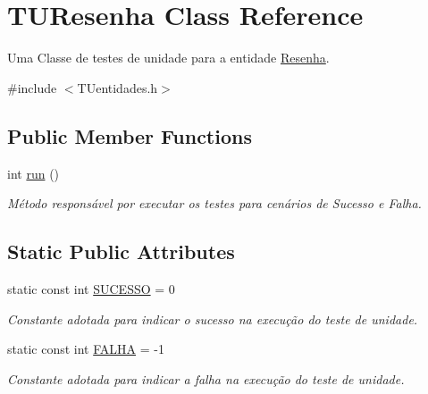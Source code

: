 \hypertarget{classTUResenha}{}\section{T\+U\+Resenha Class Reference}
\label{classTUResenha}


Uma Classe de testes de unidade para a entidade \hyperlink{classResenha}{Resenha}.  




{\ttfamily \#include $<$T\+Uentidades.\+h$>$}

\subsection*{Public Member Functions}
\begin{DoxyCompactItemize}
\item 
int \hyperlink{classTUResenha_a255531383ebe29a85c654a848288d89c}{run} ()
\begin{DoxyCompactList}\small\item\em Método responsável por executar os testes para cenários de Sucesso e Falha. \end{DoxyCompactList}\end{DoxyCompactItemize}
\subsection*{Static Public Attributes}
\begin{DoxyCompactItemize}
\item 
\mbox{\label{classTUResenha_a851535b308f0a5a46a465fc428128ea0}} 
static const int \hyperlink{classTUResenha_a851535b308f0a5a46a465fc428128ea0}{S\+U\+C\+E\+S\+SO} = 0
\begin{DoxyCompactList}\small\item\em Constante adotada para indicar o sucesso na execução do teste de unidade. \end{DoxyCompactList}\item 
\mbox{\label{classTUResenha_a947f43cb8d4384ab279d9884232dc5f7}} 
static const int \hyperlink{classTUResenha_a947f43cb8d4384ab279d9884232dc5f7}{F\+A\+L\+HA} = -\/1
\begin{DoxyCompactList}\small\item\em Constante adotada para indicar a falha na execução do teste de unidade. \end{DoxyCompactList}\end{DoxyCompactItemize}


